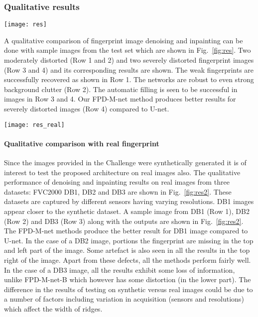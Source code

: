 \documentclass{llncs}
\begin{document}
\subsubsection{Qualitative results}
\label{sssec:qualitative}

\begin{figure*}[h!]
    \centering
    \texttt{[image: res]}
    \caption{Illustration of fingerprint denoising and inpainting results for varying distorted images. From left to right: distorted fingerprints, corresponding ground-truth, results of U-net, our methods FPD-M-net-A and FPD-M-net-B}
    \label{fig:res}
\end{figure*}

A qualitative comparison of fingerprint image denoising and inpainting can be done with sample images from the test set which are shown in Fig.~\ref{fig:res}. Two moderately distorted (Row 1 and 2) and two severely distorted fingerprint images (Row 3 and 4) and its corresponding results are shown. The weak fingerprints are successfully recovered as shown in Row 1. The networks are robust to even strong background clutter (Row 2). The automatic filling is seen to be successful in images in Row 3 and 4. Our FPD-M-net method produces better results for severely distorted images (Row 4) compared to U-net.

\begin{figure*}[t!]
    \centering
    \texttt{[image: res\_real]}
    \caption{Sample results of fingerprint denoising and inpainting on real images. From left to right: distorted fingerprints, results of U-net, our methods FPD-M-net-A and FPD-M-net-B}
    \label{fig:res2}
\end{figure*}

\paragraph{\textbf{Qualitative comparison with real fingerprint}}
Since the images provided in the Challenge were synthetically generated it is of interest to test the proposed architecture on real images also. The qualitative performance of denoising and inpainting results on real images from three datasets: FVC2000 DB1, DB2 and DB3 \cite{maio2002fvc2000} are shown in Fig.~\ref{fig:res2}. These datasets are captured by different sensors having varying resolutions. DB1 images appear closer to the synthetic dataset. A sample image from DB1 (Row 1), DB2 (Row 2) and DB3 (Row 3) along with the outputs are shown in Fig.~\ref{fig:res2}. The FPD-M-net methods produce the better result for DB1 image compared to U-net. In the case of a DB2 image, portions the fingerprint are missing in the top and left part of the image. Some artefact is also seen in all the results in the top right of the image. Apart from these defects, all the methods perform fairly well. In the case of a DB3 image, all the results exhibit some loss of information, unlike FPD-M-net-B which however has some distortion (in the lower part). The difference in the results of testing on synthetic versus real images could be due to a number of factors including variation in acquisition  (sensors and resolutions) which affect the width of ridges.
\end{document}
